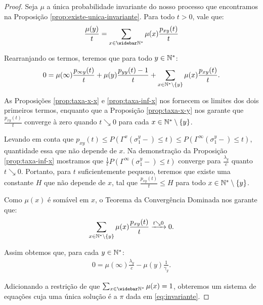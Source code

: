 \begin{proof}
  Seja $\mu$ a única probabilidade invariante do nosso processo que
  encontramos na Proposição \ref{prop:existe-unica-invariante}. Para
  todo $t > 0$, vale que:
  \begin{gather*}
    \frac{\mu(y)}{t} = \sum_{x \in \Nzb} \mu(x) \frac{p_{x y}
      (t)}{t}\\
  \end{gather*}

  Rearranjando os termos, teremos que para todo $y \in {\mathbb{N^*}}$:
  \begin{displaymath}
    0 = \mu(\infty) \frac{p_{\infty y}(t)}{t} + 
    \mu(y) \frac{p_{y y}(t) - 1}{t} + 
    \sum_{x \in {\mathbb{N^*}} \setminus \{y\}} \mu(x) \frac{p_{x
        y}(t)}{t}.
  \end{displaymath}

  As Proposições \ref{prop:taxa-x-x} e \ref{prop:taxa-inf-x} nos
  fornecem os limites dos dois primeiros termos, enquanto que a
  Proposição \ref{prop:taxa-x-y} nos garante que $\frac{p_{x
      y}(t)}{t}$ converge à zero quando $t \searrow 0$ para cada $x
  \in {\mathbb{N^*}} \setminus \{y\}$.

  Levando em conta que $p_{x y} (t) \leq P(\Gamma^x (\sigma_1^y -)
  \leq t) \leq P(\Gamma^\infty (\sigma_1^y -) \leq t)$, quantidade
  essa que não depende de $x$. Na demonstração da Proposição
  \ref{prop:taxa-inf-x} mostramos que $\frac{1}{t}P(\Gamma^\infty
  (\sigma_1^y -) \leq t)$ converge para $\frac{\lambda_y}{c}$ quanto
  $t \searrow 0$. Portanto, para $t$ suficientemente pequeno, teremos
  que existe uma constante $H$ que não depende de $x$, tal que
  $\frac{p_{x y}(t)}{t} \leq H$ para todo $x \in {\mathbb{N^*}}\setminus \{y\}$.

  Como $\mu(x)$ é somável em $x$, o Teorema da Convergência Dominada
  nos garante que:
  \begin{displaymath}
    \sum_{x \in {\mathbb{N^*}} \setminus \{y\}} \mu(x)
    \frac{p_{x y}(t)}{t} \xrightarrow{t \searrow 0} 0.
  \end{displaymath}

  Assim obtemos que, para cada $y \in {\mathbb{N^*}}$:
  \begin{gather*}
    0 = \mu(\infty) \frac{\lambda_y}{c} - \mu(y) \frac{1}{\gamma_y}.
  \end{gather*}

  Adicionando a restrição de que $\sum_{x\in\Nzb}\mu(x) = 1$,
  obteremos um sistema de equações cuja uma única solução é a $\pi$
  dada em \eqref{eq:invariante}.
\end{proof}

